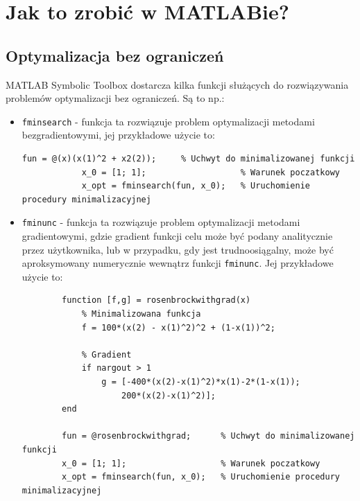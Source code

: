 \documentclass{article}
\begin{document}
\section{Jak to zrobić w MATLABie?}
    \subsection{Optymalizacja bez ograniczeń}
    MATLAB Symbolic Toolbox dostarcza kilka funkcji służących do rozwiązywania problemów optymalizacji bez ograniczeń.
    Są to np.:
    \begin{itemize}
        \item \texttt{fminsearch} - funkcja ta rozwiązuje problem optymalizacji metodami bezgradientowymi,
        jej przykładowe użycie to:
        \begin{lstlisting}[style=Matlab-editor]
            fun = @(x)(x(1)^2 + x2(2));     % Uchwyt do minimalizowanej funkcji
            x_0 = [1; 1];                   % Warunek poczatkowy
            x_opt = fminsearch(fun, x_0);   % Uruchomienie procedury minimalizacyjnej
        \end{lstlisting}
        \item \texttt{fminunc} - funkcja ta rozwiązuje problem optymalizacji metodami gradientowymi, gdzie gradient funkcji celu może być podany analitycznie przez użytkownika, lub w przypadku, gdy jest trudnoosiągalny, może być aproksymowany numerycznie wewnątrz funkcji \texttt{fminunc}.
        Jej przykładowe użycie to:
        \begin{lstlisting}[style=Matlab-editor]
        % Definicja minimalizowanej funkcji - moze zwracac dodatkowo gradient
        function [f,g] = rosenbrockwithgrad(x)
            % Minimalizowana funkcja
            f = 100*(x(2) - x(1)^2)^2 + (1-x(1))^2;

            % Gradient
            if nargout > 1
                g = [-400*(x(2)-x(1)^2)*x(1)-2*(1-x(1));
                    200*(x(2)-x(1)^2)];
        end

        fun = @rosenbrockwithgrad;      % Uchwyt do minimalizowanej funkcji
        x_0 = [1; 1];                   % Warunek poczatkowy
        x_opt = fminsearch(fun, x_0);   % Uruchomienie procedury minimalizacyjnej
    \end{lstlisting}
    \end{itemize}

\end{document}
